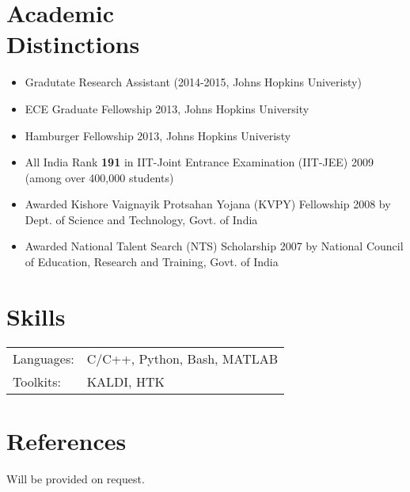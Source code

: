 \documentclass[margin,line,pifont,palatino,courier]{res}
\begin{document}
\begin{resume}
\section{\sc Academic \\ Distinctions}
\begin{itemize} \itemsep -2pt
    \item Gradutate Research Assistant (2014-2015, Johns Hopkins Univeristy)
    \item ECE Graduate Fellowship 2013, Johns Hopkins University
    \item Hamburger Fellowship 2013, Johns Hopkins Univeristy
        \item All India Rank \textbf{191} in {IIT-Joint Entrance Examination (IIT-JEE)} 2009 (among over 400,000 students) 
        \item Awarded Kishore Vaignayik Protsahan Yojana (KVPY) Fellowship 2008 by Dept. of Science and Technology, Govt. of India
        \item Awarded National Talent Search (NTS) Scholarship 2007 by National Council of Education, Research and Training, Govt. of India
    \end{itemize}

\section{\sc Skills}

\begin{tabular}{@{}p{0.8in}p{6in}}

Languages:& C/C++, Python, Bash, MATLAB\\
Toolkits: & KALDI, HTK \\

\end{tabular}

\section{\sc References}

Will be provided on request.

\end{resume}
\end{document}
